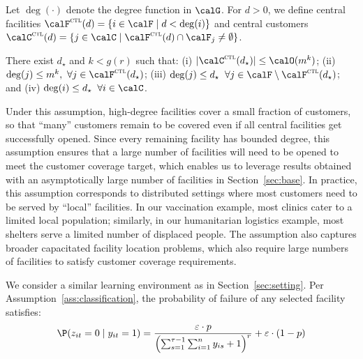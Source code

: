 \documentclass[blindrev]{informs3noheader}
\begin{document}
\begin{definition}\label{def:central}
Let $\deg(\cdot)$ denote the degree function in $\calG$. For $d>0$, we define central facilities $\calF^{\textsc{ctl}}(d)=\{i\in\calF \mid d< \deg(i)\}$ and central customers $\calC^{\textsc{ctl}}(d)= \{j\in\calC \mid \calF^{\textsc{ctl}}(d)\cap\calF_j\neq\emptyset\}$.
\end{definition}

\begin{assumption}[Degree]\label{ass:degree}
There exist $d_\star$ and $k <g(r)$ such that: (i) $|\calC^{\textsc{ctl}}(d_\star)|\leq \calO(m^k)$; (ii) $\deg(j)\leq m^k,\ \forall j\in\calF^{\textsc{ctl}}(d_\star)$; (iii) $\deg(j)\leq d_\star \;\;\forall j \in \calF\setminus\calF^{\textsc{ctl}}(d_\star)$; and (iv) $\deg(i)\leq d_\star \;\;\forall i \in \calC$.
\end{assumption}

Under this assumption, high-degree facilities cover a small fraction of customers, so that ``many'' customers remain to be covered even if all central facilities get successfully opened. Since every remaining facility has bounded degree, this assumption ensures that a large number of facilities will need to be opened to meet the customer coverage target, which enables us to leverage results obtained with an asymptotically large number of facilities in Section~\ref{sec:base}. In practice, this assumption corresponds to distributed settings where most customers need to be served by ``local'' facilities. In our vaccination example, most clinics cater to a limited local population; similarly, in our humanitarian logistics example, most shelters serve a limited number of displaced people. The assumption also captures broader capacitated facility location problems, which also require large numbers of facilities to satisfy customer coverage requirements.

We consider a similar learning environment as in Section~\ref{sec:setting}. Per Assumption~\ref{ass:classification}, the probability of failure of any selected facility satisfies:
\begin{equation}\label{eq:Bernoulli}
\P(z_{it}=0 \mid y_{it}=1)=\frac{\varepsilon\cdot p}{\left(\sum_{s=1}^{\tau-1} \sum_{i=1}^n y_{is} + 1\right)^r}+\varepsilon\cdot(1-p)
\end{equation}
\end{document}
